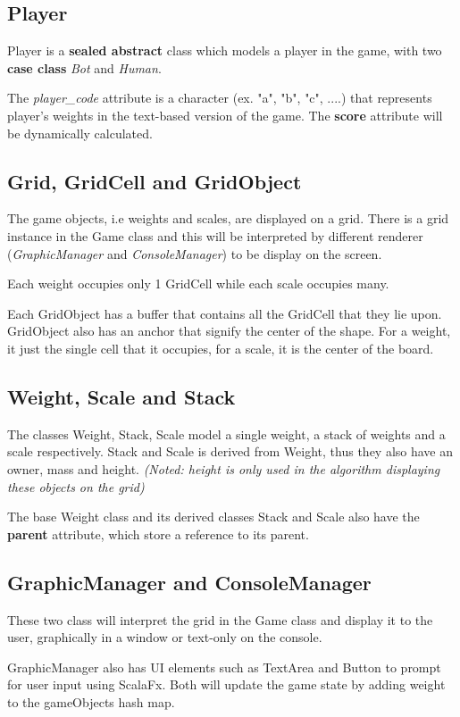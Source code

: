 \documentclass[12pt]{article}
\begin{document}
\subsection{Player}
Player is a \textbf{sealed abstract} class which models a player in the game,
with two \textbf{case class} \textit{Bot} and \textit{Human}. 

The \textit{player\_code} attribute is a character (ex. "a", "b", "c", ....)
that represents player's weights in the text-based version of the game.  The
\textbf{score} attribute will be dynamically calculated.

\subsection{Grid, GridCell and GridObject}
The game objects, i.e weights and scales, are displayed on a grid. There is a
grid instance in the Game class and this will be interpreted by different
renderer (\textit{GraphicManager} and \textit{ConsoleManager}) to be display on
the screen. 

Each weight occupies only 1 GridCell while each scale occupies many. 

Each GridObject has a buffer that contains all the GridCell that they lie upon.
GridObject also has an anchor that signify the center of the shape. For a weight,
it just the single cell that it occupies, for a scale, it is the center of the
board.
\subsection{Weight, Scale and Stack}
The classes Weight, Stack, Scale model a single weight, a stack of weights and a
scale respectively. Stack and Scale is derived from Weight, thus they also have
an owner, mass and height. \textit{(Noted: height is only used in the algorithm
displaying these objects on the grid)}

The base Weight class and its derived classes Stack and Scale also have the
\textbf{parent} attribute, which store a reference to its parent.

\subsection{GraphicManager and ConsoleManager}
These two class will interpret the grid in the Game class and display it to the user,
graphically in a window or text-only on the console. 

GraphicManager also has UI elements such as TextArea and Button to prompt for
user input using ScalaFx. Both will update the game state by adding weight to
the gameObjects hash map. 
\end{document}
